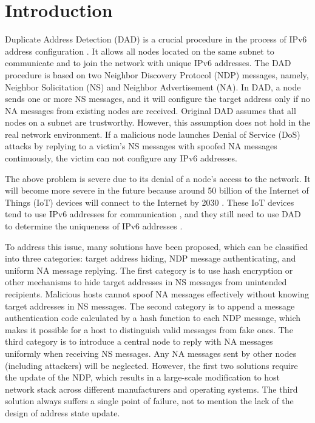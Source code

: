 \documentclass[journal]{IEEEtran}
\begin{document}
\section{Introduction}
    Duplicate Address Detection (DAD) is a crucial procedure in the process of IPv6 address configuration \cite{slaac}. It allows all nodes located on the same subnet to communicate and to join the network with unique IPv6 addresses. The DAD procedure is based on two Neighbor Discovery Protocol (NDP) \cite{NDP} messages, namely, Neighbor Solicitation (NS) and Neighbor Advertisement (NA).
    In DAD, a node sends one or more NS messages, and it will configure the target address only if no NA messages from existing nodes are received.
    Original DAD assumes that all nodes on a subnet are trustworthy. However, this assumption does not hold in the real network environment. 
    If a malicious node launches Denial of Service (DoS) attacks by replying to a victim's NS messages with spoofed NA messages continuously, the victim can not configure any IPv6 addresses.

    The above problem is severe due to its denial of a node's access to the network. 
    It will become more severe in the future because around 50 billion of the Internet of Things (IoT) devices will connect to the Internet by 2030 \cite{IOT3}. These IoT devices tend to use IPv6 addresses for communication  \cite{IoT-IPv6,LoWPAN}, and they still need to use DAD to determine the uniqueness of IPv6 addresses \cite{ipv6-iot}.
    
    To address this issue, many solutions have been proposed, which can be classified into three categories: target address hiding, NDP message authenticating, and uniform NA message replying. The first category is to use hash encryption or other mechanisms to hide target addresses in NS messages from unintended recipients. Malicious hosts cannot spoof NA messages effectively without knowing target addresses in NS messages.
    The second category is to append a message authentication code calculated by a hash function to each NDP message, which makes it possible for a host to distinguish valid messages from fake ones.
    The third category is to introduce a central node to reply with NA messages uniformly when receiving NS messages. Any NA messages sent by other nodes (including attackers) will be neglected.
    However, the first two solutions require the update of the NDP, which results in a large-scale modification to host network stack across different manufacturers and operating systems. The third solution always suffers a single point of failure, not to mention the lack of the design of address state update.
    
\end{document}
